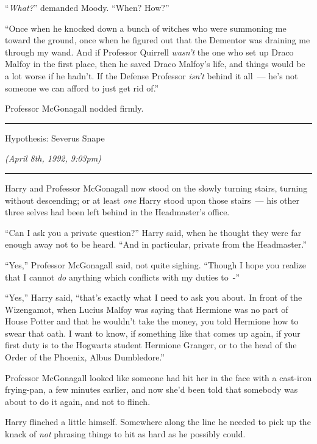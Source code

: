 ``\emph{What?}'' demanded Moody. ``When? How?''

``Once when he knocked down a bunch of witches who were summoning me toward the ground, once when he figured out that the Dementor was draining me through my wand. And if Professor Quirrell \emph{wasn't} the one who set up Draco Malfoy in the first place, then he saved Draco Malfoy's life, and things would be a lot worse if he hadn't. If the Defense Professor \emph{isn't} behind it all~--- he's not someone we can afford to just get rid of.''

Professor McGonagall nodded firmly.

\begin{center}\rule{3in}{0.4pt}\end{center}

Hypothesis: Severus Snape

\emph{(April 8th, 1992, 9:03pm)}

\begin{center}\rule{3in}{0.4pt}\end{center}

Harry and Professor McGonagall now stood on the slowly turning stairs, turning without descending; or at least \emph{one} Harry stood upon those stairs~--- his other three selves had been left behind in the Headmaster's office.

``Can I ask you a private question?'' Harry said, when he thought they were far enough away not to be heard. ``And in particular, private from the Headmaster.''

``Yes,'' Professor McGonagall said, not quite sighing. ``Though I hope you realize that I cannot \emph{do} anything which conflicts with my duties to~-''

``Yes,'' Harry said, ``that's exactly what I need to ask you about. In front of the Wizengamot, when Lucius Malfoy was saying that Hermione was no part of House Potter and that he wouldn't take the money, you told Hermione how to swear that oath. I want to know, if something like that comes up again, if your first duty is to the Hogwarts student Hermione Granger, or to the head of the Order of the Phoenix, Albus Dumbledore.''

Professor McGonagall looked like someone had hit her in the face with a cast-iron frying-pan, a few minutes earlier, and now she'd been told that somebody was about to do it again, and not to flinch.

Harry flinched a little himself. Somewhere along the line he needed to pick up the knack of \emph{not} phrasing things to hit as hard as he possibly could.

